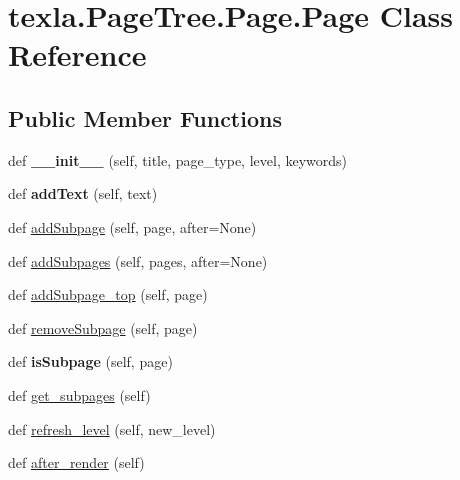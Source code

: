 \hypertarget{classtexla_1_1PageTree_1_1Page_1_1Page}{}\section{texla.\+Page\+Tree.\+Page.\+Page Class Reference}
\label{classtexla_1_1PageTree_1_1Page_1_1Page}
\subsection*{Public Member Functions}
\begin{DoxyCompactItemize}
\item 
\hypertarget{classtexla_1_1PageTree_1_1Page_1_1Page_a5590937851fd4176e0ed6d6b27904bbc}{}\label{classtexla_1_1PageTree_1_1Page_1_1Page_a5590937851fd4176e0ed6d6b27904bbc} 
def {\bfseries \+\_\+\+\_\+init\+\_\+\+\_\+} (self, title, page\+\_\+type, level, keywords)
\item 
\hypertarget{classtexla_1_1PageTree_1_1Page_1_1Page_a67eeb89e1b0fb3cf5e98d3f734d468ea}{}\label{classtexla_1_1PageTree_1_1Page_1_1Page_a67eeb89e1b0fb3cf5e98d3f734d468ea} 
def {\bfseries add\+Text} (self, text)
\item 
def \hyperlink{classtexla_1_1PageTree_1_1Page_1_1Page_a2c10bde17648f6c1c4d0ddfba6300a62}{add\+Subpage} (self, page, after=None)
\item 
def \hyperlink{classtexla_1_1PageTree_1_1Page_1_1Page_a040ae3dde5163b524191b66e91c3f80e}{add\+Subpages} (self, pages, after=None)
\item 
def \hyperlink{classtexla_1_1PageTree_1_1Page_1_1Page_ad9d4ce2ebe5586474919d5e5e9d1eac8}{add\+Subpage\+\_\+top} (self, page)
\item 
def \hyperlink{classtexla_1_1PageTree_1_1Page_1_1Page_a6c977d8a5d051a28520de3f2bf5f17ee}{remove\+Subpage} (self, page)
\item 
\hypertarget{classtexla_1_1PageTree_1_1Page_1_1Page_a1d4e034af4d7f60c0110baf8324005c2}{}\label{classtexla_1_1PageTree_1_1Page_1_1Page_a1d4e034af4d7f60c0110baf8324005c2} 
def {\bfseries is\+Subpage} (self, page)
\item 
def \hyperlink{classtexla_1_1PageTree_1_1Page_1_1Page_a6d72f71ac5e2997ad4cc46857223081b}{get\+\_\+subpages} (self)
\item 
def \hyperlink{classtexla_1_1PageTree_1_1Page_1_1Page_aa16c3d6d8ec200fa8e4414d152e84577}{refresh\+\_\+level} (self, new\+\_\+level)
\item 
def \hyperlink{classtexla_1_1PageTree_1_1Page_1_1Page_a6c12e22fb2a28e4e64678b04f8a6e70c}{after\+\_\+render} (self)

\end{DoxyCompactItemize}
